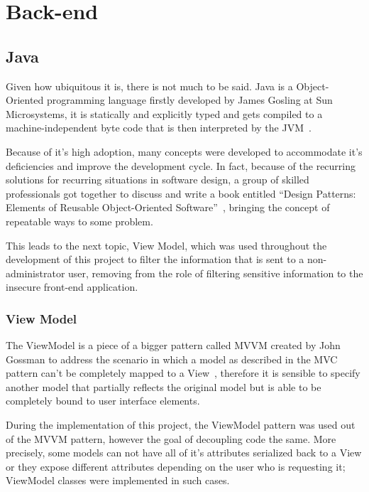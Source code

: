 \section{Back-end}
\label{cha:concepts:sec:backend}

\subsection{Java}
Given how ubiquitous it is, there is not much to be said. Java is a Object-Oriented programming language firstly developed by James Gosling at Sun Microsystems, it is statically and explicitly typed and gets compiled to a machine-independent byte code that is then interpreted by the \gls{JVM}~\cite{java}.

Because of it's high adoption, many concepts were developed to accommodate it's deficiencies and improve the development cycle. In fact, because of the recurring solutions for recurring situations in software design, a group of skilled professionals got together to discuss and write a book entitled ``Design Patterns: Elements of Reusable Object-Oriented Software''~\cite{patterns}, bringing the concept of repeatable ways to some problem.

This leads to the next topic, View Model, which was used throughout the development of this project to filter the information that is sent to a non-administrator user, removing from the role of filtering sensitive information to the insecure front-end application.

\subsubsection{View Model}
The ViewModel is a piece of a bigger pattern called \gls{MVVM} created by John Gossman to address the scenario in which a model as described in the \gls{MVC} pattern can't be completely mapped to a View~\cite{viewmodel}, therefore it is sensible to specify another model that partially reflects the original model but is able to be completely bound to user interface elements.

During the implementation of this project, the ViewModel pattern was used out of the \gls{MVVM} pattern, however the goal of decoupling code the same. More precisely, some models can not have all of it's attributes serialized back to a View or they expose different attributes depending on the user who is requesting it; ViewModel classes were implemented in such cases.

